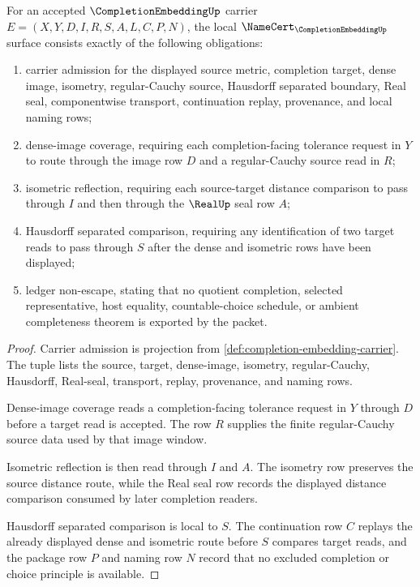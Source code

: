 \begin{theorem}
\label{thm:completion-embedding-namecert-obligations}
For an accepted $\CompletionEmbeddingUp$ carrier $E=(X,Y,D,I,R,S,A,L,C,P,N)$, the local $\NameCert_{\CompletionEmbeddingUp}$ surface consists exactly of the following obligations:
\begin{enumerate}
\item carrier admission for the displayed source metric, completion target, dense image, isometry, regular-Cauchy source, Hausdorff separated boundary, Real seal, componentwise transport, continuation replay, provenance, and local naming rows;
\item dense-image coverage, requiring each completion-facing tolerance request in $Y$ to route through the image row $D$ and a regular-Cauchy source read in $R$;
\item isometric reflection, requiring each source-target distance comparison to pass through $I$ and then through the $\RealUp$ seal row $A$;
\item Hausdorff separated comparison, requiring any identification of two target reads to pass through $S$ after the dense and isometric rows have been displayed;
\item ledger non-escape, stating that no quotient completion, selected representative, host equality, countable-choice schedule, or ambient completeness theorem is exported by the packet.
\end{enumerate}
\end{theorem}
\begin{proof}
Carrier admission is projection from \autoref{def:completion-embedding-carrier}. The tuple lists the source, target, dense-image, isometry, regular-Cauchy, Hausdorff, Real-seal, transport, replay, provenance, and naming rows.

Dense-image coverage reads a completion-facing tolerance request in $Y$ through $D$ before a target read is accepted. The row $R$ supplies the finite regular-Cauchy source data used by that image window.

Isometric reflection is then read through $I$ and $A$. The isometry row preserves the source distance route, while the Real seal row records the displayed distance comparison consumed by later completion readers.

Hausdorff separated comparison is local to $S$. The continuation row $C$ replays the already displayed dense and isometric route before $S$ compares target reads, and the package row $P$ and naming row $N$ record that no excluded completion or choice principle is available.
\end{proof}

